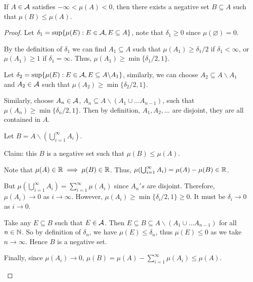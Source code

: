 \documentclass[11pt]{article}
\begin{document}
	\begin{lemma}
		If $A \in \mathcal{{A}}$ satisfies $- \infty < \mu(A) < 0$, then there exists a negative set $B \subseteq A$ such that $\mu(B) \leq \mu(A)$.
		\begin{proof}
			Let $\delta_1 = \sup\{\mu(E) : E \in \mathcal{{A}}, E \subseteq A\}$, note that $\delta_1 \geq 0$ since $\mu(\varnothing) = 0$.
			
			By the definition of $\delta_1$ we can find $A_1 \subseteq A$ such that $\mu(A_1) \geq \delta_1 / 2$ if $\delta_1 < \infty$, or $\mu(A_1) \geq 1$ if $\delta_1 = \infty$. Thus, $\mu(A_1) \geq \min\{\delta_1/2, 1\}$.
			
			Let $\delta_2 = \sup\{\mu(E) : E \in \mathcal{{A}}, E \subseteq A \backslash A_1 \}$, similarly, we can choose $A_2 \subseteq A \backslash A_1$ and $A_2 \in \mathcal{{A}}$ such that $\mu(A_2) \geq \min\{\delta_2/2, 1\}$.
			
			Similarly, choose $A_n \in \mathcal{{A}}$, $A_n \subseteq A \backslash (A_1 \cup \dots A_{n-1})$, such that $\mu(A_n) \geq \min\{\delta_n/2, 1\}$.
			Then by definition, $A_1, A_2, \dots$ are disjoint, they are all contained in $A$.
			
			Let $B = A \backslash (\bigcup_{i=1}^\infty A_i)$.
			
			Claim: this $B$ is a negative set such that $\mu(B) \leq \mu(A)$.
			\begin{tcolorbox}
				Note that $\mu(A) \in \mathbb{R} \implies \mu(B) \in \mathbb{R}$. Thus, $\mu(\bigcup_{i=1}^\infty A_i) = \mu(A) - \mu(B) \in \mathbb{R}$.
				
				But $\mu(\bigcup_{i=1}^\infty A_i) = \sum_{i=1}^\infty \mu(A_i)$ since $A_n's$ are disjoint. Therefore, $\mu(A_i) \to 0$ as $i \to \infty$.
				However, $\mu(A_i) \geq \min\{\delta_i/2, 1\} \geq 0$.
				It must be $\delta_i \to 0$ as $i \to 0$.
				
				Take any $E \subseteq B$ such that $E \in \mathcal{{A}}$. Then $E \subseteq B \subseteq A \backslash (A_1 \cup \dots A_{n-1})$ for all $n \in \mathbb{N}$. So by definition of $\delta_n$, we have $\mu(E) \leq \delta_n$, thus $\mu(E) \leq 0$ as we take $n \to \infty$. Hence $B$ is a negative set.
				
				Finally, since $\mu(A_i) \to 0$, $\mu(B) = \mu(A) - \sum_{i=1}^\infty \mu(A_i) \leq \mu(A)$.
			\end{tcolorbox}
		\end{proof}
	\end{lemma}
	
\end{document}
